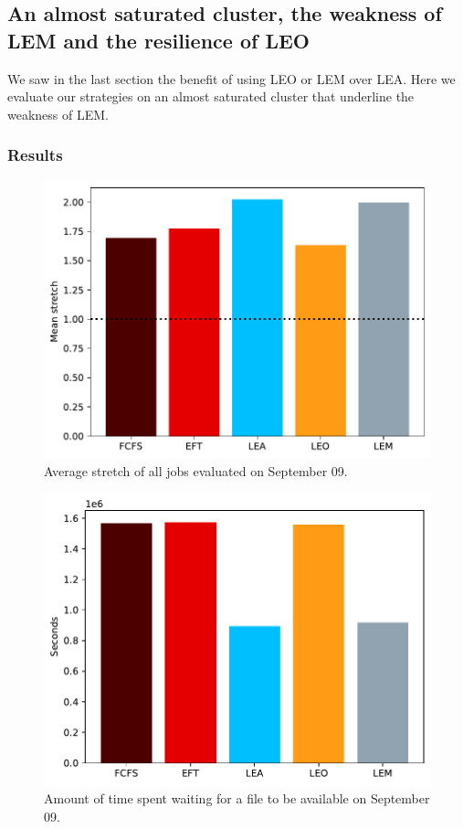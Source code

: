 \documentclass[conference,10pt]{IEEEtran}
\begin{document}
\subsection{An almost saturated cluster, the weakness of LEM and the resilience of LEO}

We saw in the last section the benefit of using LEO or LEM over LEA. Here we evaluate our strategies on an almost saturated cluster that underline the weakness of LEM.

\subsubsection{Results}

\begin{figure}[tb]\centering\includegraphics[scale=0.47]{../MBSS/plot/Results_FCFS_Score_Backfill_2022-09-09->2022-09-09_V10000_Mean_Stretch_450_128_32_256_4_1024.pdf}\caption{Average stretch of all jobs evaluated on September 09.}
\label{stretch.09-09}\end{figure}
\begin{figure}[tb]\centering\includegraphics[scale=0.47]{../MBSS/plot/Results_FCFS_Score_Backfill_2022-09-09->2022-09-09_V10000_Total_waiting_for_a_load_time_and_transfer_time_450_128_32_256_4_1024.pdf}\caption{Amount of time spent waiting for a file to be available on September 09.}
\label{load.09-09}\end{figure}
\end{document}
